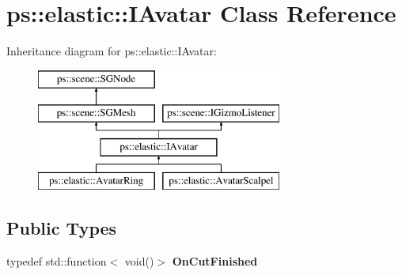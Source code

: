 \hypertarget{classps_1_1elastic_1_1IAvatar}{}\section{ps\+:\+:elastic\+:\+:I\+Avatar Class Reference}
\label{classps_1_1elastic_1_1IAvatar}
Inheritance diagram for ps\+:\+:elastic\+:\+:I\+Avatar\+:\begin{figure}[H]
\begin{center}
\leavevmode
\includegraphics[height=4.000000cm]{classps_1_1elastic_1_1IAvatar}
\end{center}
\end{figure}
\subsection*{Public Types}
\begin{DoxyCompactItemize}
\item 
\hypertarget{classps_1_1elastic_1_1IAvatar_a3fe07bb0b1d429a8e80c893b997bdbe5}{}typedef std\+::function$<$ void()$>$ {\bfseries On\+Cut\+Finished}\label{classps_1_1elastic_1_1IAvatar_a3fe07bb0b1d429a8e80c893b997bdbe5}

\end{DoxyCompactItemize}
